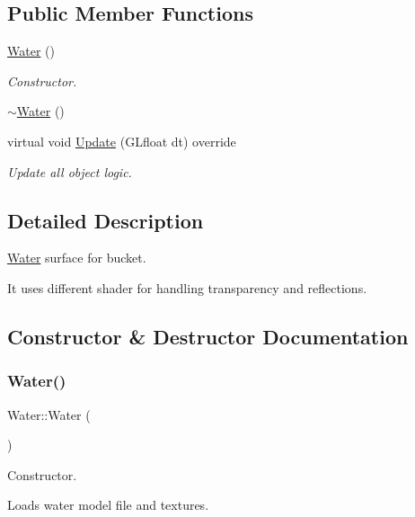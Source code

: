 \subsection*{Public Member Functions}
\begin{DoxyCompactItemize}
\item 
\mbox{\hyperlink{class_water_a32d8f391b149a405008a606ceafa35ee}{Water}} ()
\begin{DoxyCompactList}\small\item\em Constructor. \end{DoxyCompactList}\item 
\mbox{\hyperlink{class_water_aa613ad181694d2d0e18059f3822415fe}{$\sim$\+Water}} ()
\item 
virtual void \mbox{\hyperlink{class_water_a4fa8b175f9ab3d935d88311635fc8b83}{Update}} (G\+Lfloat dt) override
\begin{DoxyCompactList}\small\item\em Update all object logic. \end{DoxyCompactList}\end{DoxyCompactItemize}


\subsection{Detailed Description}
\mbox{\hyperlink{class_water}{Water}} surface for bucket. 

It uses different shader for handling transparency and reflections. 

\subsection{Constructor \& Destructor Documentation}
\mbox{\label{class_water_a32d8f391b149a405008a606ceafa35ee}} 
\subsubsection{\texorpdfstring{Water()}{Water()}}
{\footnotesize\ttfamily Water\+::\+Water (\begin{DoxyParamCaption}{ }\end{DoxyParamCaption})}



Constructor. 

Loads water model file and textures. \mbox{\label{class_water_aa613ad181694d2d0e18059f3822415fe}} 
